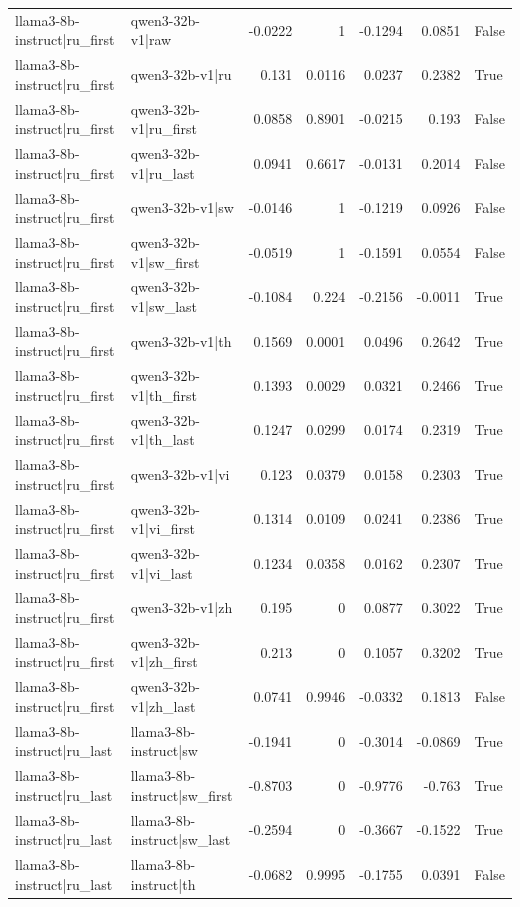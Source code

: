 \begin{table}
\begin{tabular}{l l r r r r l}
llama3-8b-instruct|ru_first & qwen3-32b-v1|raw & -0.0222 & 1 & -0.1294 & 0.0851 & False \\
llama3-8b-instruct|ru_first & qwen3-32b-v1|ru & 0.131 & 0.0116 & 0.0237 & 0.2382 & True \\
llama3-8b-instruct|ru_first & qwen3-32b-v1|ru_first & 0.0858 & 0.8901 & -0.0215 & 0.193 & False \\
llama3-8b-instruct|ru_first & qwen3-32b-v1|ru_last & 0.0941 & 0.6617 & -0.0131 & 0.2014 & False \\
llama3-8b-instruct|ru_first & qwen3-32b-v1|sw & -0.0146 & 1 & -0.1219 & 0.0926 & False \\
llama3-8b-instruct|ru_first & qwen3-32b-v1|sw_first & -0.0519 & 1 & -0.1591 & 0.0554 & False \\
llama3-8b-instruct|ru_first & qwen3-32b-v1|sw_last & -0.1084 & 0.224 & -0.2156 & -0.0011 & True \\
llama3-8b-instruct|ru_first & qwen3-32b-v1|th & 0.1569 & 0.0001 & 0.0496 & 0.2642 & True \\
llama3-8b-instruct|ru_first & qwen3-32b-v1|th_first & 0.1393 & 0.0029 & 0.0321 & 0.2466 & True \\
llama3-8b-instruct|ru_first & qwen3-32b-v1|th_last & 0.1247 & 0.0299 & 0.0174 & 0.2319 & True \\
llama3-8b-instruct|ru_first & qwen3-32b-v1|vi & 0.123 & 0.0379 & 0.0158 & 0.2303 & True \\
llama3-8b-instruct|ru_first & qwen3-32b-v1|vi_first & 0.1314 & 0.0109 & 0.0241 & 0.2386 & True \\
llama3-8b-instruct|ru_first & qwen3-32b-v1|vi_last & 0.1234 & 0.0358 & 0.0162 & 0.2307 & True \\
llama3-8b-instruct|ru_first & qwen3-32b-v1|zh & 0.195 & 0 & 0.0877 & 0.3022 & True \\
llama3-8b-instruct|ru_first & qwen3-32b-v1|zh_first & 0.213 & 0 & 0.1057 & 0.3202 & True \\
llama3-8b-instruct|ru_first & qwen3-32b-v1|zh_last & 0.0741 & 0.9946 & -0.0332 & 0.1813 & False \\
llama3-8b-instruct|ru_last & llama3-8b-instruct|sw & -0.1941 & 0 & -0.3014 & -0.0869 & True \\
llama3-8b-instruct|ru_last & llama3-8b-instruct|sw_first & -0.8703 & 0 & -0.9776 & -0.763 & True \\
llama3-8b-instruct|ru_last & llama3-8b-instruct|sw_last & -0.2594 & 0 & -0.3667 & -0.1522 & True \\
llama3-8b-instruct|ru_last & llama3-8b-instruct|th & -0.0682 & 0.9995 & -0.1755 & 0.0391 & False \\

\end{tabular}
\end{table}

